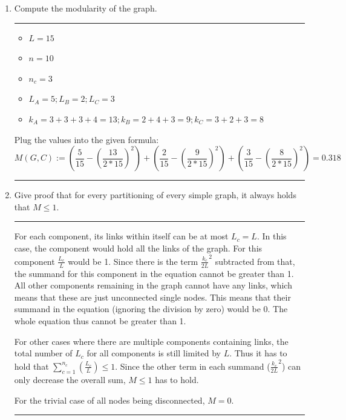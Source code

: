 \begin{enumerate}
	\item Compute the modularity of the graph.
	\hrule \relax
	\begin{itemize}
		\item $L = 15$
		\item $n = 10$
		\item $n_c = 3$
		\item $L_A = 5 ; L_B = 2 ; L_C = 3$
		\item $k_A = 3 + 3 + 3 + 4 = 13 ; k_B = 2 + 4 + 3 = 9 ; k_C = 3 + 2 + 3 = 8$
	\end{itemize}

	Plug the values into the given formula:
	\begin{equation}
		M(G,C) := ( \frac{5}{15} - (\frac{13}{2*15})^2 ) + 
		( \frac{2}{15} - (\frac{9}{2*15})^2 ) + 
		( \frac{3}{15} - (\frac{8}{2*15})^2 ) = 0.318
	\end{equation}
	
	\hrule \relax
	\item Give proof that for every partitioning of every simple graph, it always holds that $M \leq 1$.
	\hrule \relax
	
	For each component, its links within itself can be at most $L_c = L$. In this case, the component would hold all the links of the graph. For this component $\frac{L_c}{L}$ would be 1.  Since there is the term $\frac{k_c}{2L}^2$ subtracted from that, the summand for this component in the equation cannot be greater than 1. All other components remaining in the graph cannot have any links, which means that these are just unconnected single nodes.  This means that their summand in the equation (ignoring the division by zero) would be 0. The whole equation thus cannot be greater than 1.
	
	For other cases where there are multiple components containing links, the total number of $L_c$ for all components is still limited by $L$. Thus it has to hold that $\sum^{n_c}_{c=1}(\frac{L_c}{L}) \leq 1$. Since the other term in each summand ($\frac{k_c}{2L}^2$) can only decrease the overall sum, $M \leq 1$ has to hold.
	
	For the trivial case of all nodes being disconnected, $M = 0$.
	
	\hrule \relax	
\end{enumerate}